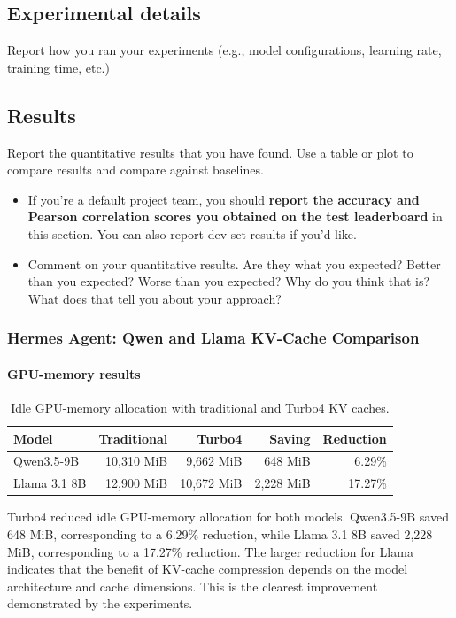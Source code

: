 \documentclass{article}
\begin{document}
\subsection{Experimental details}
Report how you ran your experiments (e.g., model configurations, learning rate, training time, etc.)

\subsection{Results}
Report the quantitative results that you have found. Use a table or plot to compare results and compare against baselines.
\begin{itemize}
    \item If you're a default project team, you should \textbf{report the accuracy and Pearson correlation scores you obtained on the test leaderboard} in this section. You can also report dev set results if you'd like. 
    \item Comment on your quantitative results. Are they what you expected? Better than you expected? Worse than you expected? Why do you think that is? What does that tell you about your approach?
\end{itemize}

\subsubsection{Hermes Agent: Qwen and Llama KV-Cache Comparison}

\paragraph{GPU-memory results}

\begin{table}[t]
\centering
\small
\caption{Idle GPU-memory allocation with traditional and Turbo4 KV caches.}
\label{tab:combined-kv-memory}
\begin{tabular}{lrrrr}
\toprule
Model & Traditional & Turbo4 & Saving & Reduction \\
\midrule
Qwen3.5-9B & 10,310 MiB & 9,662 MiB & 648 MiB & 6.29\% \\
Llama 3.1 8B & 12,900 MiB & 10,672 MiB & 2,228 MiB & 17.27\% \\
\bottomrule
\end{tabular}
\end{table}

Turbo4 reduced idle GPU-memory allocation for both models. Qwen3.5-9B
saved 648 MiB, corresponding to a 6.29\% reduction, while Llama 3.1 8B
saved 2,228 MiB, corresponding to a 17.27\% reduction. The larger reduction
for Llama indicates that the benefit of KV-cache compression depends on the
model architecture and cache dimensions. This is the clearest improvement
demonstrated by the experiments.
\end{document}
